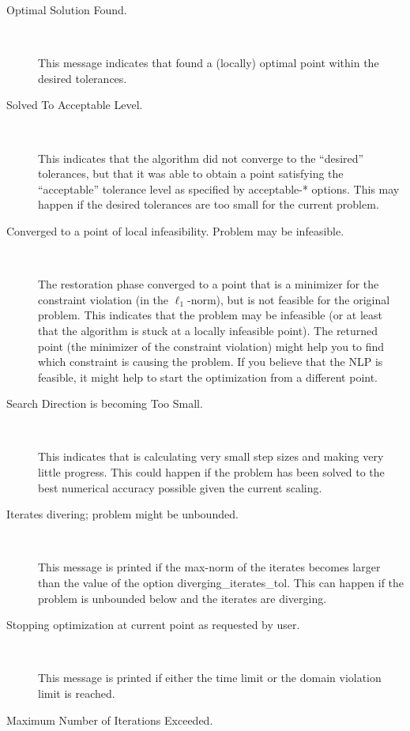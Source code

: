 \begin{description}
\item[Optimal Solution Found.] ~

    This message indicates that \IPOPT found a (locally) optimal point within the desired tolerances.

\item[Solved To Acceptable Level.] ~

    This indicates that the algorithm did not converge to the ``desired'' tolerances, but that it was able to obtain a point satisfying the ``acceptable'' tolerance level as specified by acceptable-* options.
    This may happen if the desired tolerances are too small for the current problem.

\item[Converged to a point of local infeasibility. Problem may be infeasible.] ~

    The restoration phase converged to a point that is a minimizer for the constraint violation (in the $\ell_1$-norm), but is not feasible for the original problem.
    This indicates that the problem may be infeasible (or at least that the algorithm is stuck at a locally infeasible point).
    The returned point (the minimizer of the constraint violation) might help you to find which constraint is causing the problem.
    If you believe that the NLP is feasible, it might help to start the optimization from a different point.

\item[Search Direction is becoming Too Small.] ~

    This indicates that \IPOPT is calculating very small step sizes and making very little progress.
    This could happen if the problem has been solved to the best numerical accuracy possible given the current scaling.

\item[Iterates divering; problem might be unbounded.] ~

    This message is printed if the max-norm of the iterates becomes larger than the value of the option diverging\_iterates\_tol.
    This can happen if the problem is unbounded below and the iterates are diverging.

\item[Stopping optimization at current point as requested by user.] ~

    This message is printed if either the time limit or the domain violation limit is reached.

\item[Maximum Number of Iterations Exceeded.] ~


\end{description}
